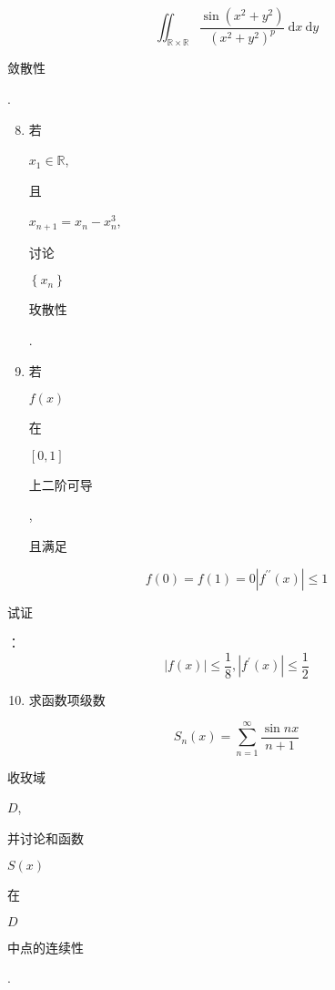\documentclass[10pt]{article}
\begin{document}
$$
\iint_{\mathbb{R} \times \mathbb{R}} \frac{\sin \left(x^{2}+y^{2}\right)}{\left(x^{2}+y^{2}\right)^{p}} \mathrm{~d} x \mathrm{~d} y
$$
\begin{CJK}{UTF8}{mj}敛散性\end{CJK}.

\begin{enumerate}
  \setcounter{enumi}{7}
  \item \begin{CJK}{UTF8}{mj}若\end{CJK} $x_{1} \in \mathbb{R}$, \begin{CJK}{UTF8}{mj}且\end{CJK} $x_{n+1}=x_{n}-x_{n}^{3}$, \begin{CJK}{UTF8}{mj}讨论\end{CJK} $\left\{x_{n}\right\}$ \begin{CJK}{UTF8}{mj}玫散性\end{CJK}.

  \item \begin{CJK}{UTF8}{mj}若\end{CJK} $f(x)$ \begin{CJK}{UTF8}{mj}在\end{CJK} $[0,1]$ \begin{CJK}{UTF8}{mj}上二阶可导\end{CJK}, \begin{CJK}{UTF8}{mj}且满足\end{CJK}

\end{enumerate}
$$
f(0)=f(1)=0\left|f^{\prime \prime}(x)\right| \leq 1
$$
\begin{CJK}{UTF8}{mj}试证\end{CJK}：
$$
|f(x)| \leq \frac{1}{8},\left|f^{\prime}(x)\right| \leq \frac{1}{2}
$$

\begin{enumerate}
  \setcounter{enumi}{9}
  \item \begin{CJK}{UTF8}{mj}求函数项级数\end{CJK}
\end{enumerate}
$$
S_{n}(x)=\sum_{n=1}^{\infty} \frac{\sin n x}{n+1}
$$
\begin{CJK}{UTF8}{mj}收玫域\end{CJK} $D$, \begin{CJK}{UTF8}{mj}并讨论和函数\end{CJK} $S(x)$ \begin{CJK}{UTF8}{mj}在\end{CJK} $D$ \begin{CJK}{UTF8}{mj}中点的连续性\end{CJK}.
\end{document}
